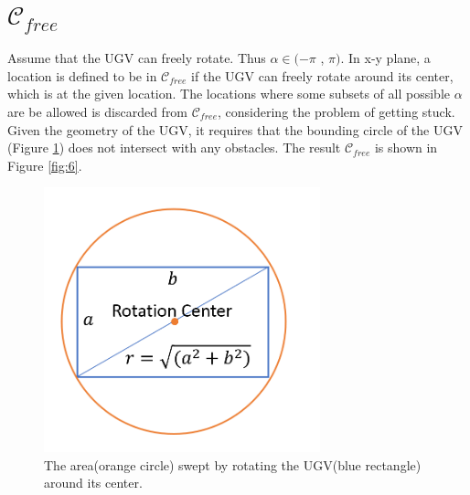 \documentclass[12pt,draftcls,onecolumn]{IEEEtran}
\begin{document}
\clearpage






\section{$\mathcal{C}_{free}$} 


Assume that the UGV can freely rotate. Thus  $ \alpha  \in (-\pi $ , $\pi) $.
In x-y plane, a location is defined to be in $\mathcal{C}_{free}$ if the UGV can freely rotate around its center, which is at the given location.
The locations where some subsets of all possible $ \alpha$ are be allowed is discarded from $\mathcal{C}_{free}$, considering the problem of getting stuck. 
Given the geometry of the UGV, it requires that the bounding circle of the UGV (Figure \ref{fig:3}) does not intersect with any obstacles.
The result $\mathcal{C}_{free}$ is shown in Figure \ref{fig:6}.

\begin{figure}
 \centering
  \includegraphics[width=8cm]{figures/rot_demo}
  \caption{The area(orange circle) swept by rotating the UGV(blue rectangle) around  its center. }
  \label{fig:3}
\end{figure}
\end{document}
